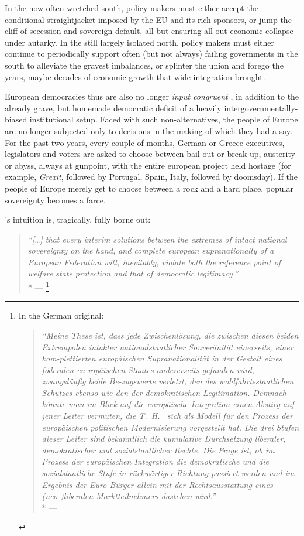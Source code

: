 In the now often wretched south, policy makers must either accept the conditional straightjacket imposed by the \gls{EU} and its rich sponsors, or jump the cliff of secession and sovereign default, all but ensuring all-out economic collapse under autarky.
In the still largely isolated north, policy makers must either continue to periodically support often (but not always) failing governments in the south to alleviate the gravest imbalances, or splinter the union and forego the years, maybe decades of economic growth that wide integration brought.

European democracies thus are also no longer \emph{input congruent} \citep{Zurn-2000-aa}, in addition to the already grave, but homemade democratic deficit of a heavily intergovernmentally-biased institutional setup.
Faced with such non-alternatives, the people of Europe are no longer subjected only to decisions in the making of which they had a say.
For the past two years, every couple of months, German or Greece executives, legislators and voters are asked to choose between bail-out or break-up, austerity or abyss, always at gunpoint, with the entire european project held hostage (for example, \emph{Grexit}, followed by Portugal, Spain, Italy, followed by doomsday).
If the people of Europe merely get to choose between a rock and a hard place, popular sovereignty becomes a farce.

\citeauthor{Offe1998}'s \citeyear{Offe1998} intuition is, tragically, fully borne out:
\begin{quote}
	\emph{``[\ldots] that every interim solutions between the extremes of intact national sovereignty on the hand, and complete european supranationalty of a European Federation will, inevitably, violate both the reference point of welfare state protection and that of democratic legitimacy.''}\\*
	--- \cite[41]{Offe1998}
	\footnote{\label{fn:Offe-regress}
		In the German original:
		\begin{quote}
			\emph{``Meine These ist, dass jede Zwischenl\"{o}sung, die zwischen diesen beiden Extrempolen intakter nationalstaatlicher Souver\"{a}nit\"{a}t einerseits, einer kom-plettierten europ\"{a}ischen Supranationalität in der Gestalt eines föderalen eu-ropäischen Staates andererseits gefunden wird, zwangsl\"{a}ufig beide Be-zugswerte verletzt, den des wohlfahrtsstaatlichen Schutzes ebenso wie den der demokratischen Legitimation.
			Demnach k\"{o}nnte man im Blick auf die europäische Integration einen Abstieg auf jener Leiter vermuten, die T.~H.~\cite{Marshall-1950-aa} sich als Modell für den Prozess der europ\"{a}ischen politischen Modernisierung vorgestellt hat.
			Die drei Stufen dieser Leiter sind bekanntlich die kumulative Durchsetzung liberaler, demokratischer und sozialstaatlicher Rechte.
			Die Frage ist, ob im Prozess der europäischen Integration die demokratische und die sozialstaatliche Stufe in r\"{u}ckw\"{a}rtiger Richtung passiert werden und im Ergebnis der Euro-B\"{u}rger allein mit der Rechtsausstattung eines (neo-)liberalen Marktteilnehmers dastehen wird.''}\\*
			--- \cite[41]{Offe1998}\\
		\end{quote}
	}
\end{quote}

